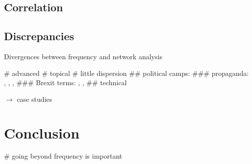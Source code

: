 \documentclass[a4paper]{scrartcl}
\begin{document}
  \subsection{Correlation}

  \subsection{Discrepancies}

    Divergences between frequency and network analysis

      \begin{easylist}[itemize]
        # advanced
        # topical
        # little dispersion
          ## political camps:
            ### propaganda: , , , 
            ### Brexit terms: , , 
          ## technical
      \end{easylist}

    $\rightarrow$ case studies

\section{Conclusion}

  \begin{easylist}[itemize]
    # going beyond frequency is important
  \end{easylist}


  \printbibliography
\end{document}

